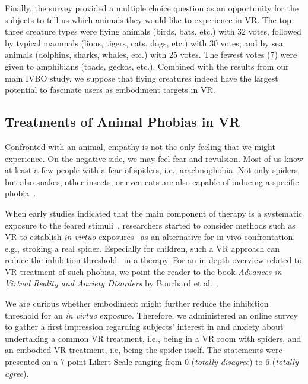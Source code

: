 Finally, the survey provided a multiple choice question as an opportunity for the subjects to tell us which animals they would like to experience in VR. The top three creature types were flying animals (birds, bats, etc.) with 32 votes, followed by typical mammals (lions, tigers, cats, dogs, etc.) with 30 votes, and by sea animals (dolphins, sharks, whales, etc.) with 25 votes. The fewest votes (7) were given to amphibians (toads, geckos, etc.). Combined with the results from our main IVBO study, we suppose that flying creatures indeed have the largest potential to fascinate users as embodiment targets in VR.



\subsection{Treatments of Animal Phobias in VR}
Confronted with an animal, empathy is not the only feeling that we might experience. On the negative side, we may feel fear and revulsion. Most of us know at least a few people with a fear of spiders, i.e., arachnophobia. Not only spiders, but also snakes, other insects, or even cats are also capable of inducing a specific phobia~\cite{shapse2008diagnostic}. 

When early studies indicated that the main component of therapy is a systematic exposure to the feared stimuli~\cite{marshall1977flooding}, researchers started to consider methods such as VR to establish \textit{in virtuo} exposures~\cite{carlin1997virtual,hoffman2003interfaces,garcia2002virtual,bouchard2006effectiveness,hoffman1998virtual} as an alternative for in vivo confrontation, e.g., stroking a real spider. Especially for children, such a VR approach can reduce the inhibition threshold~\cite{bouchard2014advances} in a therapy. For an in-depth overview related to VR treatment of such phobias, we point the reader to the book \textit{Advances in Virtual Reality and Anxiety Disorders} by Bouchard et al.~.

We are curious whether embodiment might further reduce the inhibition threshold for an \textit{in virtuo} exposure. Therefore, we administered an online survey to gather a first impression regarding subjects' interest in and anxiety about undertaking a common VR treatment, i.e., being in a VR room with spiders, and an embodied VR treatment, i.e, being the spider itself. The statements were presented on a 7-point Likert Scale ranging from 0 (\textit{totally disagree}) to 6 (\textit{totally agree}).

